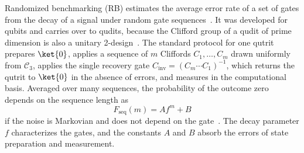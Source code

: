Randomized benchmarking (RB) estimates the average error rate of a set of gates from the decay of a signal under random gate sequences~\cite{Emerson2005,Knill2008,Magesan2011PRL}. It was developed for qubits and carries over to qudits, because the Clifford group of a qudit of prime dimension is also a unitary 2-design~\cite{Appleby2005,Dankert2009,Gross2007}. The standard protocol for one qutrit~\cite{Appleby2005,Morvan2021} prepares $\ket{0}$, applies a sequence of $m$ Cliffords $C_1, \dots, C_m$ drawn uniformly from $\mathcal{C}_3$, applies the single recovery gate $C_{\mathrm{inv}} = (C_m \cdots C_1)^{-1}$, which returns the qutrit to $\ket{0}$ in the absence of errors, and measures in the computational basis. Averaged over many sequences, the probability of the outcome zero depends on the sequence length as
\begin{equation}
F_{\mathrm{seq}}(m) = A f^{m} + B
\label{eq:fseq}
\end{equation}
if the noise is Markovian and does not depend on the gate~\cite{Magesan2011PRL,Magesan2012PRA}. The decay parameter $f$ characterizes the gates, and the constants $A$ and $B$ absorb the errors of state preparation and measurement.

